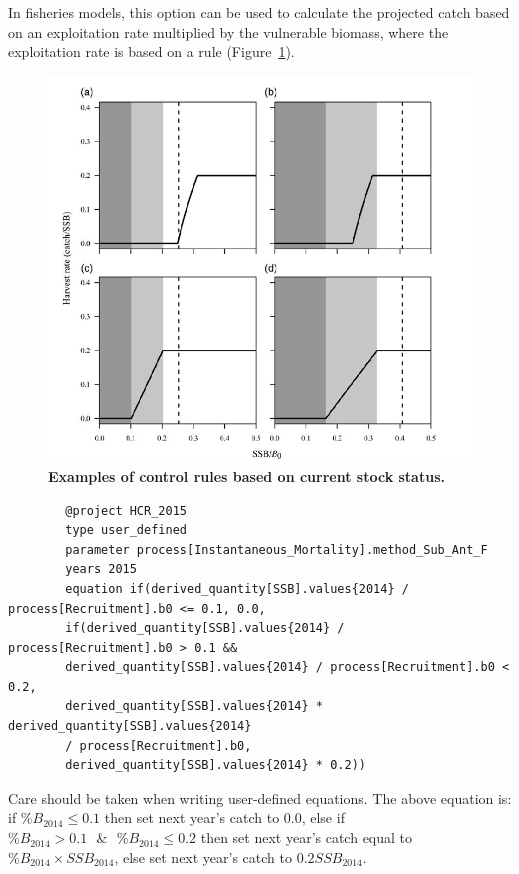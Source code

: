 In fisheries models, this option can be used to calculate the projected catch based on an exploitation rate multiplied by the vulnerable biomass, where the exploitation rate is based on a rule (Figure~\ref{fig:HCR}).

\begin{figure}[!h]
	\includegraphics[scale=0.9]{Figures/HarvestControlRules.png}
	\caption{\textbf{Examples of control rules based on current stock status.}}
	\label{fig:HCR}
\end{figure}

\pagebreak
{\small{\begin{verbatim}
		@project HCR_2015
		type user_defined
		parameter process[Instantaneous_Mortality].method_Sub_Ant_F
		years 2015
		equation if(derived_quantity[SSB].values{2014} / process[Recruitment].b0 <= 0.1, 0.0,
		if(derived_quantity[SSB].values{2014} / process[Recruitment].b0 > 0.1 &&
		derived_quantity[SSB].values{2014} / process[Recruitment].b0 < 0.2,
		derived_quantity[SSB].values{2014} * derived_quantity[SSB].values{2014}
		/ process[Recruitment].b0,
		derived_quantity[SSB].values{2014} * 0.2))
		\end{verbatim}}}

Care should be taken when writing user-defined equations. The above equation is: if $\%B_{2014} \leq 0.1$ then set next year's catch to 0.0, else if $\%B_{2014} > 0.1 \text{ } \& \text{ } \%B_{2014} \leq 0.2$ then set next year's catch equal to $\%B_{2014} \times SSB_{2014}$, else set next year's catch to $0.2 SSB_{2014}$.

